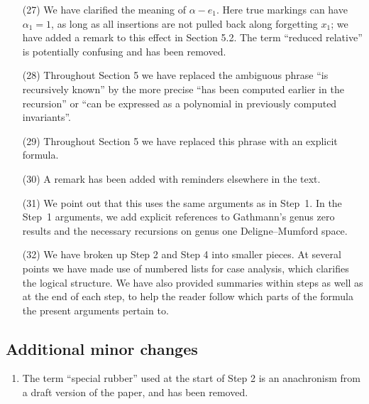 \documentclass[11pt]{amsart}
\theoremstyle{plain}
\theoremstyle{remark}
\theoremstyle{definition}
\begin{document}
\begin{enumerate}
\item[(27)] We have clarified the meaning of $\alpha-e_1$. Here true markings can have $\alpha_1=1$, as long as all insertions are not pulled back along forgetting $x_1$; we have added a remark to this effect in Section 5.2. The term ``reduced relative'' is potentially confusing and has been removed.
\item[(28)] Throughout Section 5 we have replaced the ambiguous phrase ``is recursively known'' by the more precise ``has been computed earlier in the recursion'' or ``can be expressed as a polynomial in previously computed invariants''.
\item[(29)] Throughout Section 5 we have replaced this phrase with an explicit formula.
\item[(30)] A remark has been added with reminders elsewhere in the text.
\item[(31)] We point out that this uses the same arguments as in Step~1. In the Step~1 arguments, we add explicit references to Gathmann's genus zero results and the necessary recursions on genus one Deligne--Mumford space.
\item[(32)] We have broken up Step 2 and Step 4 into smaller pieces. At several points we have made use of numbered lists for case analysis, which clarifies the logical structure. We have also provided summaries within steps as well as at the end of each step, to help the reader follow which parts of the formula the present arguments pertain to.
\end{enumerate}


\subsection*{Additional minor changes}
\begin{enumerate}
\item The term ``special rubber'' used at the start of Step 2 is an anachronism from a draft version of the paper, and has been removed.
\end{enumerate}
\end{document}
